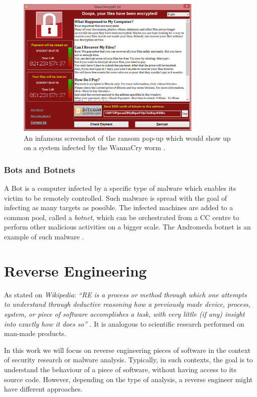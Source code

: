 \begin{figure}[ht]
    \centering
    \includegraphics[width=0.8\textwidth]{./images/wanacry.png}
    \caption{An infamous screenshot of the ransom pop-up which would show up on a system infected by the WannaCry worm \cite{wiki_wannacry}.}
    \label{fig:wannacry}
\end{figure}

\subsubsection{Bots and Botnets}

A Bot is a computer infected by a specific type of malware which enables its victim to be remotely controlled. Such malware is spread with the goal of infecting as many targets as possible. The infected machines are added to a common pool, called a \emph{botnet}, which can be orchestrated from a \gls{CC} centre to perform other malicious activities on a bigger scale. The Andromeda botnet is an example of such malware \cite{andromeda} \cite{kaspersky_malware_types}.

\section{Reverse Engineering}
\label{sec:reverse_engineering}

As stated on \emph{Wikipedia}: \emph{``\gls{RE} is a process or method through which one attempts to understand through deductive reasoning how a previously made device, process, system, or piece of software accomplishes a task, with very little (if any) insight into exactly how it does so''} \cite{re_wiki}. It is analogous to scientific research performed on man-made products.

In this work we will focus on reverse engineering pieces of software in the context of security research or malware analysis. Typically, in such contexts, the goal is to understand the behaviour of a piece of software, without having access to its source code. However, depending on the type of analysis, a reverse engineer might have different approaches. 

